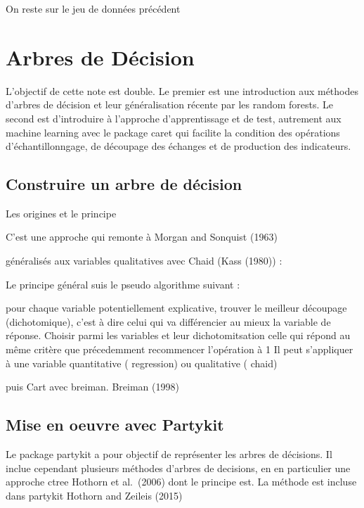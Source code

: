 \documentclass[
]{book}
\begin{document}
On reste sur le jeu de données précédent

\hypertarget{arbres-de-duxe9cision}{%
\chapter{Arbres de Décision}\label{arbres-de-duxe9cision}}

L'objectif de cette note est double. Le premier est une introduction aux méthodes d'arbres de décision et leur généralisation récente par les random forests. Le second est d'introduire à l'approche d'apprentissage et de test, autrement aux machine learning avec le package caret qui facilite la condition des opérations d'échantillonngage, de découpage des échanges et de production des indicateurs.

\hypertarget{construire-un-arbre-de-duxe9cision}{%
\section{Construire un arbre de décision}\label{construire-un-arbre-de-duxe9cision}}

Les origines et le principe

C'est une approche qui remonte à Morgan and Sonquist (1963)

généralisés aux variables qualitatives avec Chaid (Kass (1980)) :

Le principe général suis le pseudo algorithme suivant :

pour chaque variable potentiellement explicative, trouver le meilleur découpage (dichotomique), c'est à dire celui qui va différencier au mieux la variable de réponse.
Choisir parmi les variables et leur dichotomitsation celle qui répond au même critère que précedemment
recommencer l'opération à 1
Il peut s'appliquer à une variable quantitative ( regression) ou qualitative ( chaid)

puis Cart avec breiman. Breiman (1998)

\hypertarget{mise-en-oeuvre-avec-partykit}{%
\section{Mise en oeuvre avec Partykit}\label{mise-en-oeuvre-avec-partykit}}

Le package partykit a pour objectif de représenter les arbres de décisions. Il inclue cependant plusieurs méthodes d'arbres de decisions, en en particulier une approche ctree Hothorn et al.~(2006) dont le principe est. La méthode est incluse dans partykit Hothorn and Zeileis (2015)
\end{document}
